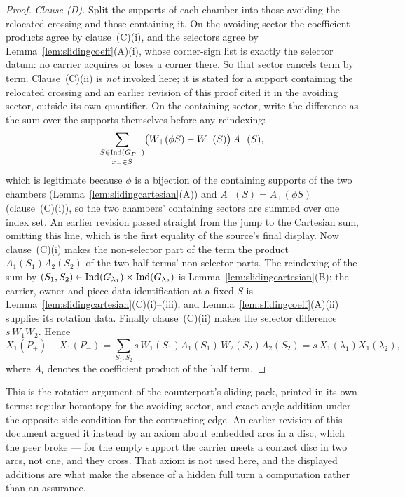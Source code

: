 \begin{proof}
\emph{Clause (D).} Split the supports of each chamber into those avoiding the relocated crossing
and those containing it. On the avoiding sector the coefficient products agree by
clause~(C)(i), and the selectors agree by
Lemma~\ref{lem:slidingcoeff}(A)(i), whose corner-sign list is exactly the selector
datum: no carrier acquires or loses a corner there. So that sector cancels term
by term. Clause~(C)(ii) is \emph{not} invoked here; it is
stated for a support containing the relocated crossing and an earlier revision
of this proof cited it in the avoiding sector, outside its own quantifier. On the containing sector, write the difference as the sum over the supports
themselves before any reindexing:
\[
   \sum_{\substack{S\in\operatorname{Ind}(G_{P_-})\\ x_-\in S}}
   \bigl(W_+(\phi S)-W_-(S)\bigr)\,A_-(S),
\]
which is legitimate because $\phi$ is a bijection of the containing supports of
the two chambers (Lemma~\ref{lem:slidingcartesian}(A)) and $A_-(S)=A_+(\phi S)$
(clause~(C)(i)), so the two chambers' containing sectors are
summed over one index set. An earlier revision passed straight from the jump to
the Cartesian sum, omitting this line, which is the first equality of the
source's final display. Now
clause~(C)(i) makes the non-selector part of the term the product
$A_1(S_1)A_2(S_2)$ of the two half terms' non-selector parts. The reindexing of
the sum by $(S_1,S_2)\in\operatorname{Ind}(G_{\lambda_1})\times\operatorname{Ind}(G_{\lambda_2})$ is
Lemma~\ref{lem:slidingcartesian}(B); the carrier, owner and piece-data
identification at a fixed $S$ is Lemma~\ref{lem:slidingcartesian}(C)(i)--(iii), and
Lemma~\ref{lem:slidingcoeff}(A)(ii) supplies its rotation data. Finally
clause~(C)(ii) makes the selector difference $s\,W_1W_2$.
Hence
\[
X_1(P_+)-X_1(P_-)
=\sum_{S_1,S_2}s\,W_1(S_1)A_1(S_1)\,W_2(S_2)A_2(S_2)
=s\,X_1(\lambda_1)X_1(\lambda_2),
\]
where $A_i$ denotes the coefficient product of the half term.
\end{proof}

\begin{remark}\label{rem:slidingsource}
This is the rotation argument of the counterpart's sliding pack, printed in its
own terms: regular homotopy for the avoiding sector, and exact angle addition
under the opposite-side condition for the contracting edge. An earlier revision
of this document argued it instead by an axiom about embedded arcs in a disc,
which the peer broke --- for the empty support the carrier meets a contact disc
in two arcs, not one, and they cross. That axiom is not used here, and the
displayed additions are what make the absence of a hidden full turn a
computation rather than an assurance.
\end{remark}


